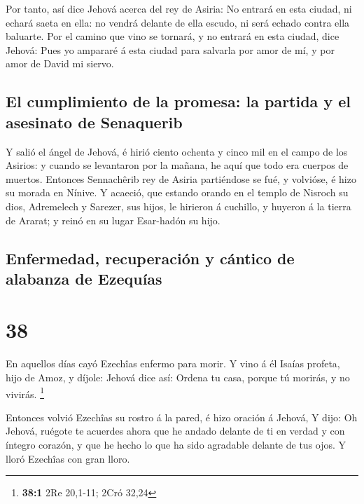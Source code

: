  Por tanto, así dice Jehová acerca del rey de Asiria: No
entrará en esta ciudad, ni echará saeta en ella: no vendrá delante de
ella escudo, ni será echado contra ella baluarte.  Por el
camino que vino se tornará, y no entrará en esta ciudad, dice Jehová:
 Pues yo ampararé á esta ciudad para salvarla por amor de
mí, y por amor de David mi siervo.

\hypertarget{el-cumplimiento-de-la-promesa-la-partida-y-el-asesinato-de-senaquerib}{%
\subsection{El cumplimiento de la promesa: la partida y el asesinato de
Senaquerib}\label{el-cumplimiento-de-la-promesa-la-partida-y-el-asesinato-de-senaquerib}}

 Y salió el ángel de Jehová, é hirió ciento ochenta y
cinco mil en el campo de los Asirios: y cuando se levantaron por la
mañana, he aquí que todo era cuerpos de muertos. 
Entonces Sennachêrib rey de Asiria partiéndose se fué, y volvióse, é
hizo su morada en Nínive.  Y acaeció, que estando orando
en el templo de Nisroch su dios, Adremelech y Sarezer, sus hijos, le
hirieron á cuchillo, y huyeron á la tierra de Ararat; y reinó en su
lugar Esar-hadón su hijo.

\hypertarget{enfermedad-recuperaciuxf3n-y-cuxe1ntico-de-alabanza-de-ezequuxedas}{%
\subsection{Enfermedad, recuperación y cántico de alabanza de
Ezequías}\label{enfermedad-recuperaciuxf3n-y-cuxe1ntico-de-alabanza-de-ezequuxedas}}

\hypertarget{section-37}{%
\section{38}\label{section-37}}

 En aquellos días cayó Ezechîas enfermo para morir. Y vino
á él Isaías profeta, hijo de Amoz, y díjole: Jehová dice así: Ordena tu
casa, porque tú morirás, y no vivirás. \footnote{\textbf{38:1} 2Re
  20,1-11; 2Cró 32,24}

 Entonces volvió Ezechîas su rostro á la pared, é hizo
oración á Jehová,  Y dijo: Oh Jehová, ruégote te acuerdes
ahora que he andado delante de ti en verdad y con íntegro corazón, y que
he hecho lo que ha sido agradable delante de tus ojos. Y lloró Ezechîas
con gran lloro.

